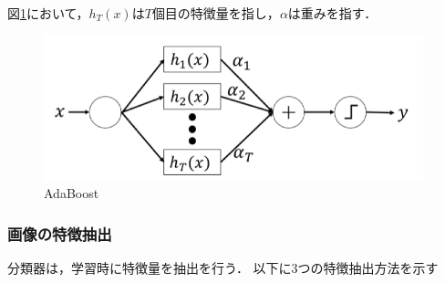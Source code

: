 図\ref{adaboost}において，$h_T(x)$は$T$個目の特徴量を指し，$\alpha$は重みを指す．

\vspace{1.5cm}


\begin{figure}[h]
    \centering
    \includegraphics[width=11cm]{image/adaboost.png}
    \caption{AdaBoost\cite{adafig}}
  \label{adaboost}
\end{figure}


\subsubsection{画像の特徴抽出}
分類器は，学習時に特徴量を抽出を行う． 
以下に3つの特徴抽出方法を示す
